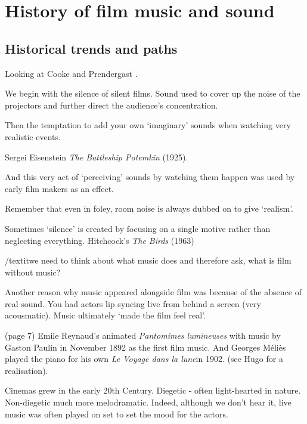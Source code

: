 
\chapter{History of film music and sound}
\label{history}

\section{Historical trends and paths}
Looking at Cooke \citeyearpar{cooke2008history} and Prendergast \citeyearpar{prendergast1992film}.

We  begin with the silence of silent films.  
Sound used to cover up the noise of the projectors and further direct the audience's concentration.

Then the temptation to add your own `imaginary' sounds when watching very realistic events. 

Sergei Eisenstein \textit{The Battleship Potemkin} (1925). 

And this very act of `perceiving' sounds by watching them happen was used by early film makers as an effect. 

Remember that even in foley, room noise is always dubbed on to give `realism'.

Sometimes `silence' is created by focusing on a single motive rather than neglecting everything. Hitchcock's \textit{The Birds} (1963) 

/textit{we need to think about what music does and therefore ask, what is film without music?}

Another reason why music appeared alongside film was because of the absence of real sound. You had actors lip syncing live from behind a screen (very acousmatic). Music ultimately `made the film feel real'. 

(page 7) Emile Reynaud's animated \textit{Pantomimes lumineuses} with music by Gaston Paulin in November 1892 as the first film music. And Georges M\'eli\`es played the piano for his own \textit{Le Voyage dans la lune}in 1902. (see Hugo for a realisation). 

Cinemas grew in the early 20th Century. 
Diegetic - often light-hearted in nature. Non-diegetic much more melodramatic. Indeed, although we don't hear it, live music was often played on set to set the mood for the actors.  

